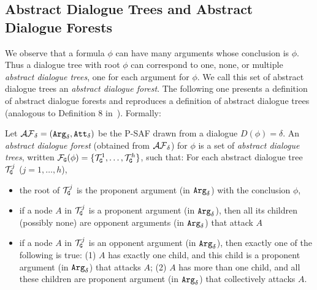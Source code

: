 \subsection{Abstract Dialogue Trees and Abstract Dialogue Forests}
\label{def:abstract-dia-forest}
 We observe that a formula $\phi$ can have many arguments whose conclusion is $\phi$. 
 Thus a dialogue tree with root $\phi$ can correspond to one, none, or multiple \emph{abstract dialogue trees}, one for each argument for $\phi$.
 We call this set of abstract dialogue trees an \emph{abstract dialogue forest}.
 The following one presents a definition of abstract dialogue forests
 and reproduces a definition of abstract dialogue trees (analogous to Definition 8 in~\cite{loanho_2024}).
 Formally:
 

\begin{definition} 
\label{def:abstract-forests}
Let $ \mathcal{AF}_ \delta  =  (\texttt{\textup{Arg}}_ \delta, \texttt{\textup{Att}}_ \delta)$ be the P-SAF drawn from a dialogue $D(\phi)  =  \delta$. An \emph{abstract dialogue forest} (obtained from $ \mathcal{AF}_ \delta$) for $\phi$ is a set of \emph{abstract dialogue trees}, written $\mathcal{F}_{\texttt{\textup{G}}}(\phi)  =  \{\mathcal{T}^{1}_{\texttt{\textup{G}}}, \ldots, \mathcal{T}^{h}_{\texttt{\textup{G}}}\}$, such that: For each abstract dialogue tree $\mathcal{T}^{j}_{\texttt{\textup{G}}}$ ($j = 1, \ldots, h$), 

\begin{itemize}
    \item the root of $\mathcal{T}^{j}_{\texttt{\textup{G}}}$ is the proponent argument (in $\texttt{\textup{Arg}}_ \delta$) with the conclusion $\phi$,

    \item if a node $A$ in $\mathcal{T}^{j}_{\texttt{\textup{G}}}$ is a proponent argument (in $\texttt{\textup{Arg}}_ \delta$), then all its children (possibly none) are opponent arguments (in $\texttt{\textup{Arg}}_ \delta$) that attack $A$
    

     \item if a node $A$ in $\mathcal{T}^{j}_{\texttt{\textup{G}}}$ is an opponent argument (in $\texttt{\textup{Arg}}_ \delta$), then exactly one of the following is true: (1) $A$ has exactly one child, and this child is a proponent argument  (in $\texttt{\textup{Arg}}_ \delta$) that attacks $A$; (2) $A$ has more than one child, and all these children are proponent argument  (in $\texttt{\textup{Arg}}_ \delta$) that collectively attacks $A$.
     
\end{itemize}   
\end{definition}

